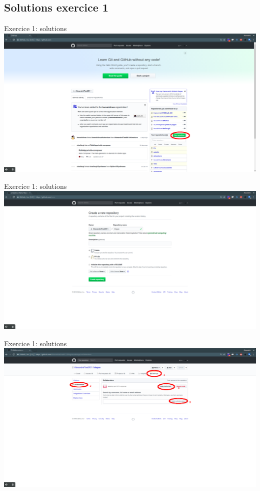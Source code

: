 \documentclass{beamer}
\begin{document}
\subsection{Solutions exercice 1}
\begin{frame}{Exercice 1: solutions}
    \centering
    \includegraphics[width=\textwidth]{img/image_exercices/repo_creat.png}
\end{frame}

\begin{frame}{Exercice 1: solutions}
    \centering
    \includegraphics[width=\textwidth]{img/image_exercices/repo_config.png}
\end{frame}

\begin{frame}{Exercice 1: solutions}
    \centering
    \includegraphics[width=\textwidth]{img/image_exercices/add_collab.png}
\end{frame}
\end{document}
